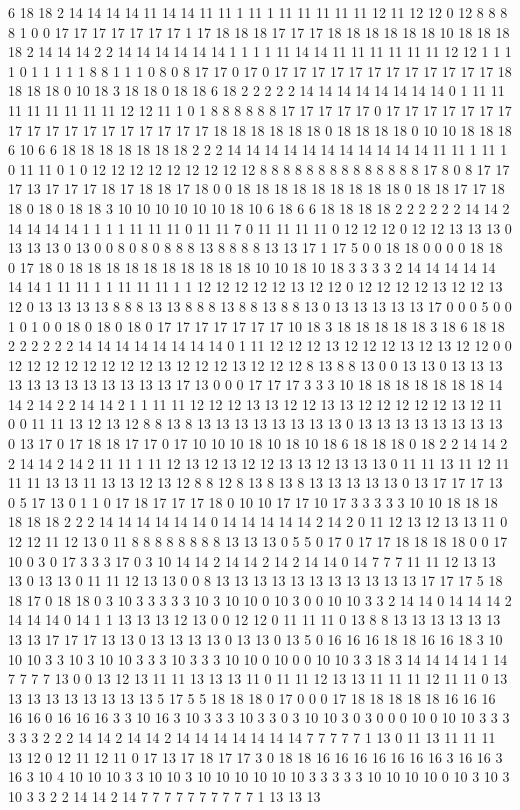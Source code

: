 6 18 18 2 14 14 14 14 11 14 14 11 11 1 11 1 11 11 11 11 11 12 11 12 12 0 12 8 8 8 8 1 0 0 17 17 17 17 17 17 17 1 17 18 18 18 17 17 17 18 18 18 18 18 18 10 18 18 18 18 2 14 14 14 2 2 14 14 14 14 14 14 1 1 1 1 11 14 14 11 11 11 11 11 11 12 12 1 1 1 1 0 1 1 1 1 1 8 8 1 1 1 0 8 0 8 17 17 0 17 0 17 17 17 17 17 17 17 17 17 17 17 17 18 18 18 18 0 10 18 3 18 18 0 18 18 6 18 2 2 2 2 2 14 14 14 14 14 14 14 14 0 1 11 11 11 11 11 11 11 11 12 12 11 1 0 1 8 8 8 8 8 8 17 17 17 17 17 0 17 17 17 17 17 17 17 17 17 17 17 17 17 17 17 17 17 17 18 18 18 18 18 18 0 18 18 18 18 0 10 10 18 18 18 6 10 6 6 18 18 18 18 18 18 18 2 2 2 14 14 14 14 14 14 14 14 14 14 14 11 11 1 11 1 0 11 11 0 1 0 12 12 12 12 12 12 12 12 12 8 8 8 8 8 8 8 8 8 8 8 8 8 8 17 8 0 8 17 17 17 13 17 17 17 18 17 18 18 17 18 0 0 18 18 18 18 18 18 18 18 18 0 18 18 17 17 18 18 0 18 0 18 18 3 10 10 10 10 10 10 18 10 6 18 6 6 18 18 18 18 2 2 2 2 2 2 14 14 2 14 14 14 14 1 1 1 1 11 11 11 0 11 11 7 0 11 11 11 11 0 12 12 12 0 12 12 13 13 13 0 13 13 13 0 13 0 0 8 0 8 0 8 8 8 13 8 8 8 8 13 13 17 1 17 5 0 0 18 18 0 0 0 0 18 18 0 17 18 0 18 18 18 18 18 18 18 18 18 18 10 10 18 10 18 3 3 3 3 2 14 14 14 14 14 14 14 1 11 11 1 1 11 11 11 1 1 12 12 12 12 12 13 12 12 0 12 12 12 12 13 12 12 13 12 0 13 13 13 13 8 8 8 13 13 8 8 8 13 8 8 13 8 8 13 0 13 13 13 13 13 17 0 0 0 5 0 0 1 0 1 0 0 18 0 18 0 18 0 17 17 17 17 17 17 17 10 18 3 18 18 18 18 18 3 18 6 18 18 2 2 2 2 2 2 14 14 14 14 14 14 14 14 0 1 11 12 12 12 13 12 12 12 13 12 13 12 12 0 0 12 12 12 12 12 12 12 12 13 12 12 12 13 12 12 12 8 13 8 8 13 0 0 13 13 0 13 13 13 13 13 13 13 13 13 13 13 13 17 13 0 0 0 17 17 17 3 3 3 10 18 18 18 18 18 18 18 14 14 2 14 2 2 14 14 2 1 1 11 11 12 12 12 13 13 12 12 13 13 12 12 12 12 12 13 12 11 0 0 11 11 13 12 13 12 8 8 13 8 13 13 13 13 13 13 13 13 0 13 13 13 13 13 13 13 13 0 13 17 0 17 18 18 17 17 0 17 10 10 10 18 10 18 10 18 6 18 18 18 0 18 2 2 14 14 2 2 14 14 2 14 2 11 11 1 11 12 13 12 13 12 12 13 13 12 13 13 13 0 11 11 13 11 12 11 11 11 13 13 11 13 13 12 13 12 8 8 12 8 13 8 13 8 13 13 13 13 13 0 13 17 17 17 13 0 5 17 13 0 1 1 0 17 18 17 17 17 18 0 10 10 17 17 10 17 3 3 3 3 3 10 10 18 18 18 18 18 18 2 2 2 14 14 14 14 14 14 0 14 14 14 14 14 2 14 2 0 11 12 13 12 13 13 11 0 12 12 11 12 13 0 11 8 8 8 8 8 8 8 8 13 13 13 0 5 5 0 17 0 17 17 18 18 18 18 0 0 17 10 0 3 0 17 3 3 3 17 0 3 10 14 14 2 14 14 2 14 2 14 14 0 14 7 7 7 11 11 12 13 13 13 0 13 13 0 11 11 12 13 13 0 0 8 13 13 13 13 13 13 13 13 13 13 13 17 17 17 5 18 18 17 0 18 18 0 3 10 3 3 3 3 3 10 3 10 10 0 10 3 0 0 10 10 3 3 2 14 14 0 14 14 14 2 14 14 14 0 14 1 1 13 13 13 12 13 0 0 12 12 0 11 11 11 0 13 8 8 13 13 13 13 13 13 13 13 17 17 17 13 13 0 13 13 13 13 0 13 13 0 13 5 0 16 16 16 18 18 16 16 18 3 10 10 10 3 3 10 3 10 10 3 3 3 10 3 3 3 10 10 0 10 0 0 10 10 3 3 18 3 14 14 14 14 1 14 7 7 7 7 13 0 0 13 12 13 11 11 13 13 13 11 0 11 11 12 13 13 11 11 11 12 11 11 0 13 13 13 13 13 13 13 13 13 5 17 5 5 18 18 18 0 17 0 0 0 17 18 18 18 18 18 16 16 16 16 16 0 16 16 16 3 3 10 16 3 10 3 3 3 10 3 3 0 3 10 10 3 0 3 0 0 0 10 0 10 10 3 3 3 3 3 3 2 2 2 14 14 2 14 14 2 14 14 14 14 14 14 14 7 7 7 7 7 1 13 0 11 13 11 11 11 13 12 0 12 11 12 11 0 17 13 17 18 17 17 3 0 18 18 16 16 16 16 16 16 16 3 16 16 3 16 3 10 4 10 10 10 3 3 10 10 3 10 10 10 10 10 10 3 3 3 3 3 10 10 10 10 0 10 3 10 3 10 3 3 2 2 14 14 2 14 7 7 7 7 7 7 7 7 7 7 1 13 13 13 